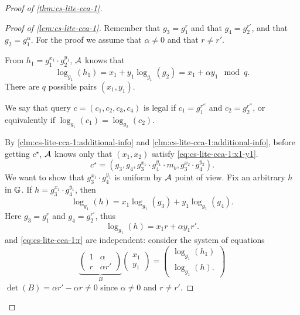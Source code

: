 \begin{proof}[Proof of \cref{thm:cs-lite-cca-1}]
	\begin{proof}[Proof of \cref{lem:cs-lite-cca-1}]
		Remember that $g_3 = g_1^r$ and that $g_4 = g_2^{r'}$, and that $g_2 = g_1^{\alpha}$.
		For the proof we assume that $\alpha \neq 0$ and that $r \neq r'$.

		From $h_1 = g_1^{x_1} \cdot g_2^{y_1}$, $\mathcal{A}$ knows that
		\begin{equation} \label{eq:cs-lite-cca-1:x1-y1}
			\log_{g_1} (h_1) = x_1 + y_1 \log_{g_1} (g_2) = x_1 + \alpha y_1 \mod q.
		\end{equation}
		There are $q$ possible pairs $(x_1, y_1)$.

		We say that query $c = (c_1, c_2, c_3, c_4)$ is legal if $c_1 = g_1^{r''}$ and $c_2 = g_2^{r''}$, or equivalently if $\log_{g_1}(c_1) = \log_{g_2}(c_2)$.

		By \cref{clm:cs-lite-cca-1:additional-info} and \cref{clm:cs-lite-cca-1:additional-info}, before getting $c^{\star}$, $\mathcal{A}$ knows only that $(x_1, x_2)$ satisfy \cref{eq:cs-lite-cca-1:x1-y1}.
		\begin{equation*}
			c^{\star} = (g_3, g_4, g_3^{x_1} \cdot g_4^{y_1} \cdot m_b, g_3^{x_2} \cdot g_4^{y_2}).
		\end{equation*}
		We want to show that $g_3^{x_1} \cdot g_4^{y_1}$ is uniform by $\mathcal{A}$ point of view.
		Fix an arbitrary $h$ in $\mathbb{G}$.
		If $h = g_3^{x_1} \cdot g_4^{y_1}$, then
		\begin{equation*}
			\log_{g_1}(h) = x_1 \log_{g_1} (g_3) + y_1 \log_{g_1}(g_4).
		\end{equation*}
		Here $g_3 = g_1^{r}$ and $g_4 = g_2^{r'}$, thus
		\begin{equation} \label{eq:cs-lite-cca-1:r}
			\log_{g_1}(h) = x_1 r + \alpha y_1 r'.
		\end{equation}
		 and \cref{eq:cs-lite-cca-1:r} are independent: consider the system of equations
		\begin{equation*}
			\underbrace{
			\begin{pmatrix}
				1 & \alpha \\
				r & \alpha r'
			\end{pmatrix}
			}_{B}
			\begin{pmatrix}
				x_1 \\
				y_1
			\end{pmatrix}
			=
			\begin{pmatrix}
				\log_{g_1}(h_1) \\
				\log_{g_1}(h).
			\end{pmatrix}
		\end{equation*}
		$\det(B) = \alpha r' - \alpha r \neq 0$ since $\alpha \neq 0$ and $r \neq r'$.


\end{proof}
\end{proof}
